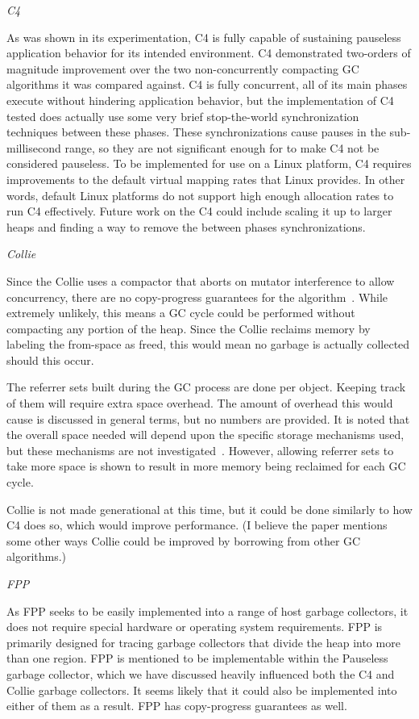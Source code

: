 \documentclass{sig-alternate}
\begin{document}
\emph{C4}

As was shown in its experimentation, C4 is fully capable of sustaining pauseless application
behavior for its intended environment. C4 demonstrated two-orders of magnitude improvement
over the two non-concurrently compacting GC algorithms it was compared against. C4 is
fully concurrent, all of its main phases execute without hindering application behavior,
but the implementation of C4 tested does actually use some very brief stop-the-world synchronization
techniques between these phases. These synchronizations cause pauses in the sub-millisecond range, so
they are not significant enough for to make C4 not be considered pauseless. To be 
implemented for use on a Linux platform, C4 requires improvements to the default 
virtual mapping rates that Linux provides. In other words, default Linux platforms 
do not support high enough allocation rates to run C4 effectively. Future work 
on the C4 could include scaling it up to larger heaps and 
finding a way to remove the between phases synchronizations.

\emph{Collie}

Since the Collie uses a compactor that aborts on mutator interference to allow
concurrency, there are no copy-progress guarantees for the algorithm~\cite{Osterlund:FPP}.
While extremely unlikely, this means a GC cycle could be performed without compacting
any portion of the heap. Since the Collie reclaims memory by labeling the from-space as freed,
this would mean no garbage is actually collected should this occur.

The referrer sets built during the GC process are done per object. Keeping track of them
will require extra space overhead. The amount of overhead this would cause is discussed in
general terms, but no numbers are provided. It is noted that the overall space needed will 
depend upon the specific storage mechanisms used, but these mechanisms are not 
investigated~\cite{Iyengar:Collie}. However, allowing referrer sets to take
more space is shown to result in more memory being reclaimed for each GC cycle.

Collie is not made generational at this time, but it could be done similarly
to how C4 does so, which would improve performance. (I believe the paper
mentions some other ways Collie could be improved by borrowing from other
GC algorithms.)

\emph{FPP}

As FPP seeks to be easily implemented into a range of host garbage collectors, 
it does not require special hardware or operating system requirements. FPP
is primarily designed for tracing garbage collectors that divide the heap
into more than one region. 
FPP is mentioned to be implementable within the Pauseless garbage collector,
which we have discussed heavily influenced both the C4 and Collie garbage collectors.
It seems likely that it could also be implemented into either of them as a result.
FPP has copy-progress guarantees as well.
\end{document}
